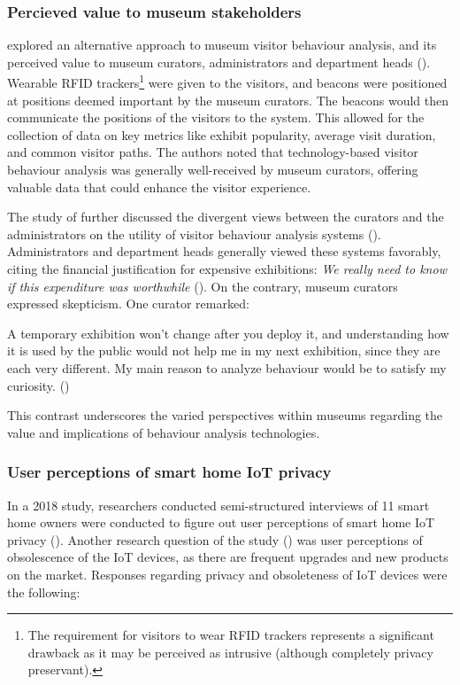 \subsubsection{Percieved value to museum stakeholders}
\citeauthor{la2017museumbehaviouranalysis} explored an alternative approach to museum visitor behaviour analysis, and its perceived value to museum curators, administrators and department heads (\citeyear{la2017museumbehaviouranalysis}). Wearable RFID trackers\footnote{The requirement for visitors to wear RFID trackers represents a significant drawback as it may be perceived as intrusive (although completely privacy preservant).} were given to the visitors, and beacons were positioned at positions deemed important by the museum curators. The beacons would then communicate the positions of the visitors to the system. This allowed for the collection of data on key metrics like exhibit popularity, average visit duration, and common visitor paths. The authors noted that technology-based visitor behaviour analysis was generally well-received by museum curators, offering valuable data that could enhance the visitor experience.

The study of \citeauthor{la2017museumbehaviouranalysis} further discussed the divergent views between the curators and the administrators on the utility of visitor behaviour analysis systems (\citeyear{la2017museumbehaviouranalysis}). Administrators and department heads generally viewed these systems favorably, citing the financial justification for expensive exhibitions: \textit{We really need to know if this expenditure was worthwhile} (\cite{la2017museumbehaviouranalysis}). On the contrary, museum curators expressed skepticism. One curator remarked: 

\begin{myquote}
    A temporary exhibition won't change after you deploy it, and understanding how it is used by the public would not help me in my next exhibition, since they are each very different. My main reason to analyze behaviour would be to satisfy my curiosity. (\cite{la2017museumbehaviouranalysis})
\end{myquote}

This contrast underscores the varied perspectives within museums regarding the value and implications of behaviour analysis technologies. 

\subsubsection{User perceptions of smart home IoT privacy}
\label{sec:smarthomeprivacy}
In a 2018 study, researchers conducted semi-structured interviews of 11 smart home owners were conducted to figure out user perceptions of smart home IoT privacy (\citeauthor{zh2018userperceptionsofIoTPrivacy}). Another research question of the study (\cite{zh2018userperceptionsofIoTPrivacy}) was user perceptions of obsolescence of the IoT devices, as there are frequent upgrades and new products on the market. Responses regarding privacy and obsoleteness of IoT devices were the following:

